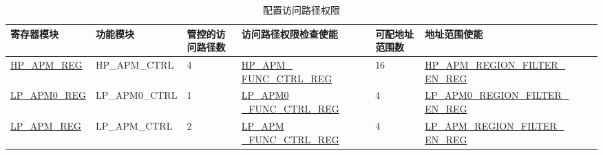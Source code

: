 \documentclass[main\_\_CN.tex]{subfiles}
\begin{document}
\begin{longtable}[C]{|p{2.5cm}|p{2.5cm}|p{1.5cm}|p{3cm}|p{2cm}|p{4.5cm}|}
    \caption{配置访问路径权限}
    \label{tab:apm-reg}\\\hline 
    \rowcolor{lightgray}
    \textbf{寄存器模块} & \textbf{功能模块} & \textbf{管控的访问路径数} & \textbf{访问路径权限检查使能} & \textbf{可配地址范围数} & \textbf{地址范围使能}\\ \hline 
    \endfirsthead
    \endlastfoot
    
    \hyperref[sec:permctrl-reg-hp]{HP\_APM\_REG} & HP\_APM\_CTRL & 4 &\hyperref[regdesc:HPAPMFUNCCTRLREG]{HP\_APM\_ FUNC\_CTRL\_REG} & 16 & \hyperref[fielddesc:HPAPMREGIONFILTEREN]{HP\_APM\_REGION\_FILTER\_ EN\_REG}\\ \hline 
    
    \hyperref[sec:permctrl-reg-lp0]{LP\_APM0\_REG} & LP\_APM0\_CTRL & 1 & \hyperref[regdesc:LPAPM0FUNCCTRLREG]{LP\_APM0 \_FUNC\_CTRL\_REG} & 4 & \hyperref[fielddesc:LPAPM0REGIONFILTEREN]{LP\_APM0\_REGION\_FILTER\_ EN\_REG}\\ \hline 
    
    \hyperref[sec:permctrl-reg-lp]{LP\_APM\_REG} & LP\_APM\_CTRL & 2 & \hyperref[regdesc:LPAPMFUNCCTRLREG]{LP\_APM \_FUNC\_CTRL\_REG} & 4 & \hyperref[fielddesc:LPAPMREGIONFILTEREN]{LP\_APM\_REGION\_FILTER\_ EN\_REG}\\ \hline 
    
\end{longtable}
\end{document}
